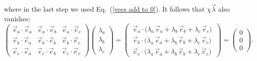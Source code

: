 where in the last step we used Eq.\ (\ref{vecs add to 0}). It follows that $\chi \vec{\lambda}$ also vanishes:
\begin{equation}
\begin{pmatrix}
\vec{e}_a \! \cdot   \vec{e}_a &  \vec{e}_a \! \cdot  \vec{e}_b  &   \vec{e}_a \! \cdot  \vec{e}_c  \\[.2cm]
\vec{e}_b \! \cdot  \vec{e}_a & \vec{e}_b \! \cdot  \vec{e}_b & \vec{e}_b \! \cdot  \vec{e}_c \\[.2cm]
\vec{e}_c \! \cdot  \vec{e}_a & \vec{e}_c \! \cdot  \vec{e}_b  & \vec{e}_c \! \cdot  \vec{e}_c
\end{pmatrix} \!
\begin{pmatrix}
\lambda_a \\[.2cm]
\lambda_b \\[.2cm]
\lambda_c
\end{pmatrix}
= \begin{pmatrix}
\, \vec{e}_a \! \cdot \! \big(\lambda_a \, \vec{e}_a + \lambda_b \, \vec{e}_b  + \lambda_c \, \vec{e}_c \big) \, \\[.2cm]
\, \vec{e}_b \! \cdot \! \big(\lambda_a \, \vec{e}_a + \lambda_b \, \vec{e}_b  + \lambda_c \, \vec{e}_c \big)  \, \\[.2cm]
\, \vec{e}_c \! \cdot \! \big(\lambda_a \, \vec{e}_a + \lambda_b \, \vec{e}_b  + \lambda_c \, \vec{e}_c \big)  \,
\end{pmatrix} =
\begin{pmatrix}
0 \\[.2cm]
0 \\[.2cm]
0
\end{pmatrix}.
\label{eigenvector lambda}
\end{equation}

